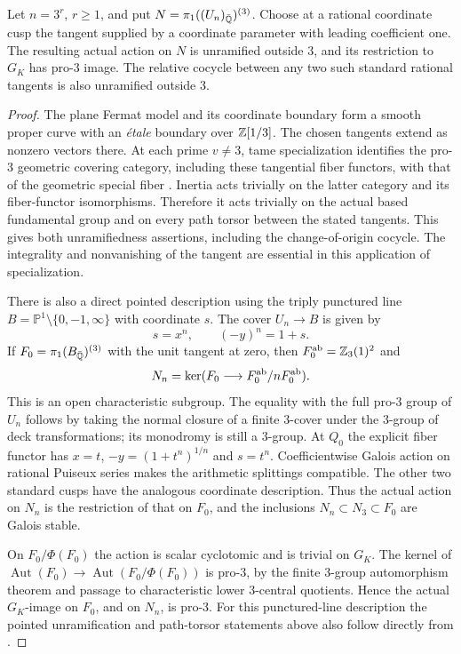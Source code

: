 \begin{lemma}\label{lem:action}
Let $n=3^r$, $r\geq1$, and put
$N=\pi_1((U_n)_{\bar{\mathbb Q}})^{(3)}$. Choose at a rational coordinate
cusp the tangent supplied by a coordinate parameter with leading
coefficient one. The resulting actual action on $N$ is unramified
outside $3$, and its restriction to $G_K$ has pro-$3$ image.
The relative cocycle between any two such standard rational
tangents is also unramified outside $3$.
\end{lemma}
\begin{proof}
The plane Fermat model and its coordinate boundary form a smooth
proper curve with an \emph{\'{e}tale} boundary over $\mathbb Z[1/3]$.
The chosen tangents extend as nonzero vectors there. At each
prime $v\ne3$, tame specialization identifies the pro-$3$
geometric covering category, including these tangential fiber
functors, with that of the geometric special fiber
\citep[Expos\'e XIII, \S2]{SGA1}. Inertia acts trivially on the
latter category and its fiber-functor isomorphisms. Therefore it
acts trivially on the actual based fundamental group and on every
path torsor between the stated tangents. This gives both
unramifiedness assertions, including the change-of-origin cocycle.
The integrality and nonvanishing of the tangent are essential in
this application of specialization.

There is also a direct pointed description using the triply punctured
line $B=\mathbb P^1\setminus\{0,-1,\infty\}$ with coordinate $s$.
The cover $U_n\to B$ is given by
\[
s=x^n,\qquad(-y)^n=1+s.
\]
If $F_0=\pi_1(B_{\bar{\mathbb Q}})^{(3)}$ with the unit tangent at zero,
then $F_0^{\mathrm{ab}}=\mathbb Z_3(1)^2$ and
\[
N_n=\ker(F_0\longrightarrow F_0^{\mathrm{ab}}/nF_0^{\mathrm{ab}}).
\]
This is an open characteristic subgroup. The equality with the full
pro-$3$ group of $U_n$ follows by taking the normal closure of a finite
$3$-cover under the $3$-group of deck transformations; its monodromy
is still a $3$-group. At $Q_0$ the explicit fiber functor has
$x=t$, $-y=(1+t^n)^{1/n}$ and $s=t^n$. Coefficientwise Galois action
on rational Puiseux series makes the arithmetic splittings compatible.
The other two standard cusps have the analogous coordinate description.
Thus the actual action on $N_n$ is the restriction of that on $F_0$,
and the inclusions $N_n\subset N_3\subset F_0$ are Galois stable.

On $F_0/\Phi(F_0)$ the action is scalar cyclotomic and is trivial
on $G_K$. The kernel of
$\operatorname{Aut}(F_0)\to\operatorname{Aut}(F_0/\Phi(F_0))$
is pro-$3$, by the finite $3$-group automorphism theorem and passage
to characteristic lower $3$-central quotients. Hence the actual
$G_K$-image on $F_0$, and on $N_n$, is pro-$3$.
For this punctured-line description the pointed unramification and
path-torsor statements above also follow directly from
\citet[Theorem 17.7 and Corollary 17.8, p.~51]{Wojtkowiak2009}.
\end{proof}

